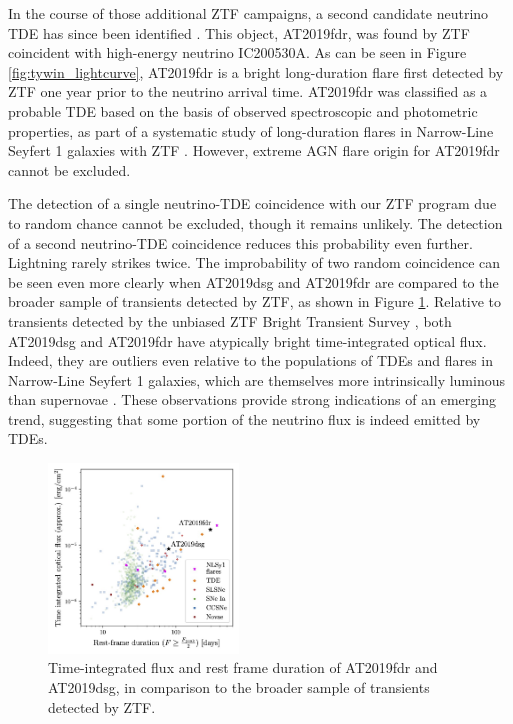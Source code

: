 \documentclass[a4paper,11pt]{article}
\begin{document}
In the course of those additional ZTF campaigns, a second candidate neutrino TDE has since been identified \cite{ic200530a_ztf}. This object, AT2019fdr, was found by ZTF coincident with high-energy neutrino IC200530A. As can be seen in Figure \ref{fig:tywin_lightcurve}, AT2019fdr is a bright long-duration flare first detected by ZTF one year prior to the neutrino arrival time. AT2019fdr was classified as a probable TDE based on the basis of observed spectroscopic and photometric properties, as part of a systematic study of long-duration flares in Narrow-Line Seyfert 1 galaxies with ZTF \cite{frederick_20}. However, extreme AGN flare origin for AT2019fdr cannot be excluded.

The detection of a single neutrino-TDE coincidence with our ZTF program due to random chance cannot be excluded, though it remains unlikely. The detection of a second neutrino-TDE coincidence reduces this probability even further. Lightning rarely strikes twice. The improbability of two random coincidence can be seen even more clearly when AT2019dsg and AT2019fdr are compared to the broader sample of transients detected by ZTF, as shown in Figure \ref{fig:ztf_transients}. Relative to transients detected by the unbiased ZTF Bright Transient Survey \cite{ztf_bts_1, ztf_bts_2}, both AT2019dsg and AT2019fdr have atypically bright time-integrated optical flux. Indeed, they are outliers even relative to the populations of TDEs and flares in Narrow-Line Seyfert 1 galaxies, which are themselves more intrinsically luminous than supernovae \cite{van_velzen_20, frederick_20}. These observations provide strong indications of an emerging trend, suggesting that some portion of the neutrino flux is indeed emitted by TDEs.

\begin{figure}[!ht]
	\centering
	\includegraphics[width=0.45\textwidth]{figures/ztf_transients}
	\caption{Time-integrated flux and rest frame duration of AT2019fdr and AT2019dsg, in comparison to the broader sample of transients detected by ZTF. }
	\label{fig:ztf_transients}
\end{figure}
\end{document}
